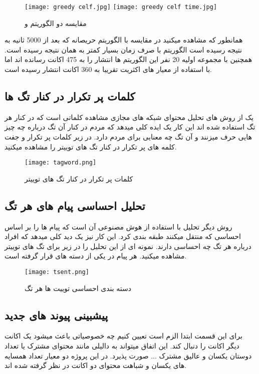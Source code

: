 \documentclass[12pt]{article}
\begin{document}
\begin{figure}[htbp]
\texttt{[image: greedy celf.jpg]}
\texttt{[image: greedy celf time.jpg]}
\caption{مقایسه دو الگوریتم
 و 
}
\end{figure}


همانطور که مشاهده ميکنيد در مقايسه با الگوريتم حريصانه که بعد از 5000 ثانيه به نتيجه رسيده است 
الگوريتم 
 با صرف زمان بسيار کمتر به همان نتيجه رسيده است.
همچنين با مجموعه اوليه 20 نفر اين الگوريتم ها انتشار را به 475 اکانت رسانده اند اما با استفاده از معيار 
های اکثريت تقريبا به 360 اکانت انتشار رسيده است.

\newpage

\subsection{کلمات پر تکرار در کنار تگ ها }
يک از روش های تحليل محتوای شبکه های مجازی مشاهده کلماتی است که در کنار هر تگ استفاده شده 
اند اين کار يک ايده کلی ميدهد که مردم در کنار آن تگ درباره چه چيز هايی حرف ميزنند و آن تگ چه 
معنايی برای مردم دارد. در زير کلمات پر تکرار و جفت کلمه های پر تکرار در کنار تگ های توييتر را 
مشاهده ميکنيد.

\begin{figure}[htbp]
\centering
\texttt{[image: tagword.png]}
\caption{کلمات پر تکرار در کنار تگ های توییتر}
\end{figure}

\newpage

\subsection{تحلیل احساسی پیام های هر تگ}
روش ديگر تحليل با استفاده از هوش مصنوعی آن است که پيام ها را بر اساس احساسی که منتقل ميکنند
طبقه بندی کرد. اين کار نيز يک ديد کلی ميدهد که افراد درباره هر تگ چه احساسی دارند.
نمونه ای از اين تحليل را در زير برای تگ های توييتر مشاهده ميکنيد.
هر پیام در یکی از دسته های 
قرار گرفته است.

\begin{figure}[htbp]
\centering
\texttt{[image: tsent.png]}
\caption{دسته بندی احساسی توییت ها هر تگ}
\end{figure}

\newpage

\subsection{پیشبینی پیوند های جدید}
برای اين قسمت ابتدا الزم است تعيين کنيم چه خصوصياتی باعث ميشود يک اکانت ديگر اکانت را دنبال 
کند.
اين اتفاق ميتواند به داليلی مانند محتوای مشترک يا تعداد دوستان يکسان و عاليق مشترک ... صورت 
پذيرد.
در اين پروژه دو معيار تعداد همسايه های يکسان و شباهت محتوای دو اکانت در نظر گرفته شده اند.
\end{document}
